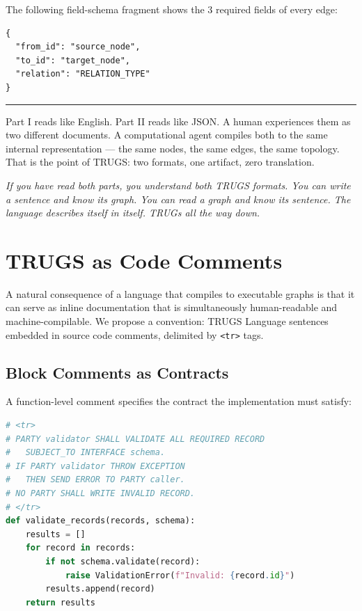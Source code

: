 \documentclass{article}
\begin{document}
The following field-schema fragment shows the 3 required fields of every edge:

\begin{lstlisting}[style=jsonfragment]
{
  "from_id": "source_node",
  "to_id": "target_node",
  "relation": "RELATION_TYPE"
}
\end{lstlisting}

\bigskip
\noindent\rule{\textwidth}{0.4pt}
\bigskip

Part I reads like English. Part II reads like JSON. A human experiences them as two different documents. A computational agent compiles both to the same internal representation --- the same nodes, the same edges, the same topology. That is the point of TRUGS: two formats, one artifact, zero translation.

\bigskip

\noindent\textit{If you have read both parts, you understand both TRUGS formats. You can write a sentence and know its graph. You can read a graph and know its sentence. The language describes itself in itself. TRUGs all the way down.}

\section{TRUGS as Code Comments}

A natural consequence of a language that compiles to executable graphs is that it can serve as inline documentation that is simultaneously human-readable and machine-compilable. We propose a convention: TRUGS Language sentences embedded in source code comments, delimited by \texttt{<tr>} tags.

\subsection{Block Comments as Contracts}

A function-level comment specifies the contract the implementation must satisfy:

\begin{lstlisting}[language=Python]
# <tr>
# PARTY validator SHALL VALIDATE ALL REQUIRED RECORD
#   SUBJECT_TO INTERFACE schema.
# IF PARTY validator THROW EXCEPTION
#   THEN SEND ERROR TO PARTY caller.
# NO PARTY SHALL WRITE INVALID RECORD.
# </tr>
def validate_records(records, schema):
    results = []
    for record in records:
        if not schema.validate(record):
            raise ValidationError(f"Invalid: {record.id}")
        results.append(record)
    return results
\end{lstlisting}
\end{document}
